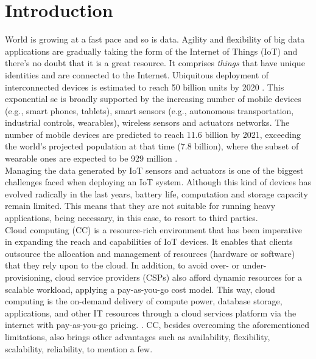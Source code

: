 \section{Introduction}\label{sec:Introduction}
\noindent
World is growing at a fast pace and so is data. Agility and flexibility of big data applications are gradually taking the form of the Internet of Things (IoT) and there’s no doubt that it is a great resource. It comprises \textit{things} that have unique identities and are connected to the Internet. Ubiquitous deployment of interconnected devices is estimated to reach 50 billion units by 2020 \cite{evans2011internet}. This exponential se is broadly supported by the increasing number of mobile devices (e.g., smart phones, tablets), smart sensors (e.g., autonomous transportation, industrial controls, wearables), wireless sensors and actuators networks. The number of mobile devices are predicted to reach 11.6 billion by 2021, exceeding the world’s projected population at that time (7.8 billion), where the subset of wearable ones are expected to be 929 million \cite{CiscoVis16:online}. \\
\noindent\tab Managing the data generated by IoT sensors and actuators is one of the biggest challenges faced when deploying an IoT system. Although this kind of devices has evolved radically in the last years, battery life, computation and storage capacity remain limited. This means that they are not suitable for running heavy applications, being necessary, in this case, to resort to third parties.\\
\noindent\tab Cloud computing (CC) is a resource-rich environment that has been imperative in expanding the reach and capabilities of IoT devices. It enables that clients outsource the allocation and management of resources (hardware or software) that they rely upon to the cloud. In addition, to avoid over- or under-provisioning, cloud service providers (CSPs) also afford dynamic resources for a scalable workload, applying a pay-as-you-go cost model. This way, cloud computing is the on-demand delivery of compute power, database storage, applications, and other IT resources through a cloud services platform via the internet with pay-as-you-go pricing. \cite{WhatisCl79:online}. CC, besides overcoming the aforementioned limitations, also brings other advantages such as availability, flexibility, scalability, reliability, to mention a few.\\

